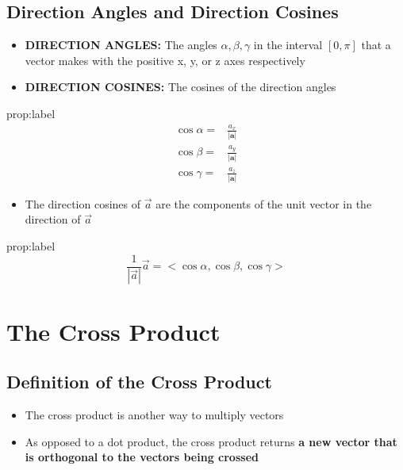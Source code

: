 \documentclass{package/notes}
\begin{document}
\subsection{Direction Angles and Direction Cosines}

\begin{itemize}
	\item \textbf{DIRECTION ANGLES:} The angles $\alpha, \beta, \gamma$ in the interval $[0,\pi]$ that a vector makes with the positive x, y, or z axes respectively
	\item \textbf{DIRECTION COSINES:} The cosines of the direction angles
\end{itemize}

\begin{proposition}{prop:label}
	$$
	\begin{aligned}
		\cos \alpha =& \frac{a_x}{|\mathbf{a}|}\\
		\cos \beta =& \frac{a_y}{|\mathbf a|}\\
		\cos \gamma =& \frac{a_z}{|\mathbf a|}
	\end{aligned}
	$$
\end{proposition}

\begin{itemize}
	\item The direction cosines of $\vec a$ are the components of the unit vector in the direction of $\vec a$ 
\end{itemize}

\begin{proposition}{prop:label}
	$$\frac{1}{|\vec a|}\vec a = <\cos\alpha, \cos\beta, \cos\gamma>$$
\end{proposition}

\section{The Cross Product}

\subsection{Definition of the Cross Product}

\begin{itemize}
	\item The cross product is another way to multiply vectors
	\item As opposed to a dot product, the cross product returns \textbf{a new vector that is orthogonal to the vectors being crossed}
\end{itemize}
\end{document}
